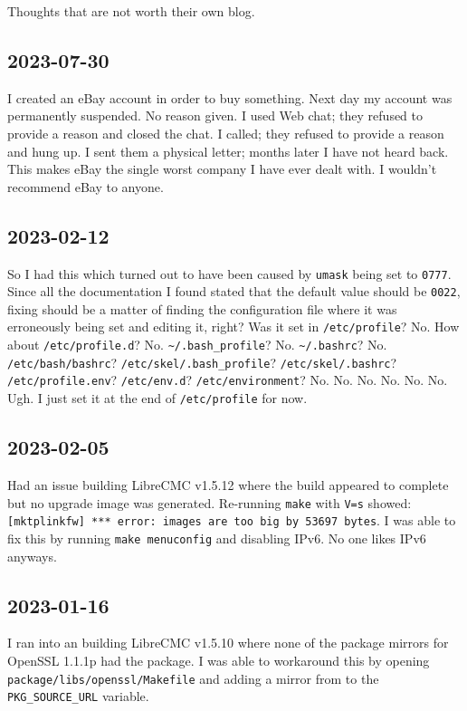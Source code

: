 \documentclass{article}
\begin{document}
Thoughts that are not worth their own blog.

\subsection{2023-07-30}
I created an eBay account in order to buy something.
Next day my account was permanently suspended.
No reason given.
I used Web chat; they refused to provide a reason and closed the chat.
I called; they refused to provide a reason and hung up.
I sent them a physical letter; months later I have not heard back.
This makes eBay the single worst company I have ever dealt with.
I wouldn't recommend eBay to anyone.

\subsection{2023-02-12}
So I had this  which turned out to have been caused by \texttt{umask} being set to \texttt{0777}.  Since all the documentation I found stated that the default value should be \texttt{0022}, fixing should be a matter of finding the configuration file where it was erroneously being set and editing it, right?  Was it set in \texttt{/etc/profile}?  No.  How about \texttt{/etc/profile.d}?  No.  \texttt{\textasciitilde /.bash_profile}?  No.  \texttt{\textasciitilde /.bashrc}?  No.  \texttt{/etc/bash/bashrc}?  \texttt{/etc/skel/.bash_profile}?  \texttt{/etc/skel/.bashrc}?  \texttt{/etc/profile.env}?  \texttt{/etc/env.d}?  \texttt{/etc/environment}?  No.  No.  No.  No.  No.  No.  Ugh.  I just set it at the end of \texttt{/etc/profile} for now.

\subsection{2023-02-05}
Had an issue building LibreCMC v1.5.12 where the build appeared to complete but no upgrade image was generated.  Re-running \texttt{make} with \texttt{V=s} showed: \texttt{[mktplinkfw] *** error: images are too big by 53697 bytes}.  I was able to fix this by running \texttt{make menuconfig} and disabling IPv6.  No one likes IPv6 anyways.

\subsection{2023-01-16}
I ran into an  building LibreCMC v1.5.10 where none of the package mirrors for OpenSSL 1.1.1p had the package.  I was able to workaround this by opening \texttt{package/libs/openssl/Makefile} and adding a mirror from  to the \texttt{PKG_SOURCE_URL} variable.
\end{document}
